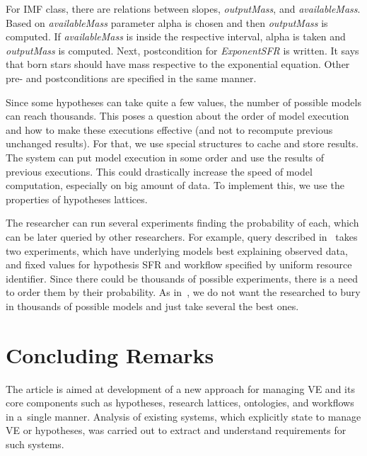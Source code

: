 \begin{multicols}{2}
      For IMF class, there are relations between slopes, \textit{outputMass}, and 
\textit{availableMass}. Based on \textit{availableMass} parameter alpha is chosen 
and then \textit{outputMass} is computed. If \textit{availableMass} is inside the 
respective interval, alpha is taken and \textit{outputMass} is computed. Next,  
postcondition for \textit{ExponentSFR} is written. It says that born stars should have 
mass respective to the exponential equation. Other pre- and postconditions are 
specified in the same manner. 
      
      Since some hypotheses can take quite a few values, the number of possible 
models can reach thousands. This poses a question about the order of model 
execution and how to make these executions effective (and not to recompute previous 
unchanged results). For that, we use special structures to cache and store results. The 
system can put model execution in some order and use the results of previous 
executions. This could drastically increase the speed of model computation, 
especially on big amount of data. To implement this, we use the properties of hypotheses 
lattices.
      
      The researcher can run several experiments finding the probability of each, 
which can be later queried by other researchers. For example, query described 
in~\cite{3-tar} takes two experiments, which have underlying models best explaining 
observed data, and fixed values for hypothesis SFR and workflow specified by 
uniform resource identifier. 
Since there could be thousands of possible experiments, there is a need to order them 
by their probability. As in~\cite{6-tar}, we do not want the researched to bury in 
thousands of possible models and just take several the best ones.

\vspace*{-9pt}
      
      \section{Concluding Remarks}
      
      \vspace*{-2pt}

\noindent
The article is aimed at development of a new approach for managing VE and its core 
components such as hypotheses, research lattices, ontologies, and workflows in 
a~single manner. Analysis of existing systems, which explicitly state to manage VE 
or hypotheses, was carried out to extract and understand requirements for such 
systems.
      

\end{multicols}

